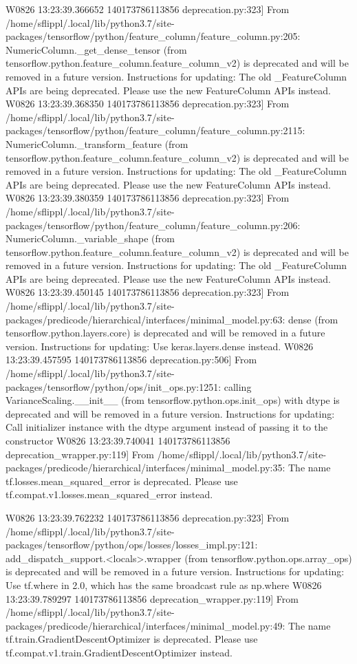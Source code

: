 \documentclass[letterpaper,10pt,english]{sphinxmanual}
\begin{document}
{\begin{sphinxVerbatim}[commandchars=\\\{\}]
W0826 13:23:39.366652 140173786113856 deprecation.py:323] From /home/sflippl/.local/lib/python3.7/site-packages/tensorflow/python/feature\_column/feature\_column.py:205: NumericColumn.\_get\_dense\_tensor (from tensorflow.python.feature\_column.feature\_column\_v2) is deprecated and will be removed in a future version.
Instructions for updating:
The old \_FeatureColumn APIs are being deprecated. Please use the new FeatureColumn APIs instead.
W0826 13:23:39.368350 140173786113856 deprecation.py:323] From /home/sflippl/.local/lib/python3.7/site-packages/tensorflow/python/feature\_column/feature\_column.py:2115: NumericColumn.\_transform\_feature (from tensorflow.python.feature\_column.feature\_column\_v2) is deprecated and will be removed in a future version.
Instructions for updating:
The old \_FeatureColumn APIs are being deprecated. Please use the new FeatureColumn APIs instead.
W0826 13:23:39.380359 140173786113856 deprecation.py:323] From /home/sflippl/.local/lib/python3.7/site-packages/tensorflow/python/feature\_column/feature\_column.py:206: NumericColumn.\_variable\_shape (from tensorflow.python.feature\_column.feature\_column\_v2) is deprecated and will be removed in a future version.
Instructions for updating:
The old \_FeatureColumn APIs are being deprecated. Please use the new FeatureColumn APIs instead.
W0826 13:23:39.450145 140173786113856 deprecation.py:323] From /home/sflippl/.local/lib/python3.7/site-packages/predicode/hierarchical/interfaces/minimal\_model.py:63: dense (from tensorflow.python.layers.core) is deprecated and will be removed in a future version.
Instructions for updating:
Use keras.layers.dense instead.
W0826 13:23:39.457595 140173786113856 deprecation.py:506] From /home/sflippl/.local/lib/python3.7/site-packages/tensorflow/python/ops/init\_ops.py:1251: calling VarianceScaling.\_\_init\_\_ (from tensorflow.python.ops.init\_ops) with dtype is deprecated and will be removed in a future version.
Instructions for updating:
Call initializer instance with the dtype argument instead of passing it to the constructor
W0826 13:23:39.740041 140173786113856 deprecation\_wrapper.py:119] From /home/sflippl/.local/lib/python3.7/site-packages/predicode/hierarchical/interfaces/minimal\_model.py:35: The name tf.losses.mean\_squared\_error is deprecated. Please use tf.compat.v1.losses.mean\_squared\_error instead.

W0826 13:23:39.762232 140173786113856 deprecation.py:323] From /home/sflippl/.local/lib/python3.7/site-packages/tensorflow/python/ops/losses/losses\_impl.py:121: add\_dispatch\_support.<locals>.wrapper (from tensorflow.python.ops.array\_ops) is deprecated and will be removed in a future version.
Instructions for updating:
Use tf.where in 2.0, which has the same broadcast rule as np.where
W0826 13:23:39.789297 140173786113856 deprecation\_wrapper.py:119] From /home/sflippl/.local/lib/python3.7/site-packages/predicode/hierarchical/interfaces/minimal\_model.py:49: The name tf.train.GradientDescentOptimizer is deprecated. Please use tf.compat.v1.train.GradientDescentOptimizer instead.


\end{sphinxVerbatim}}
\end{document}
